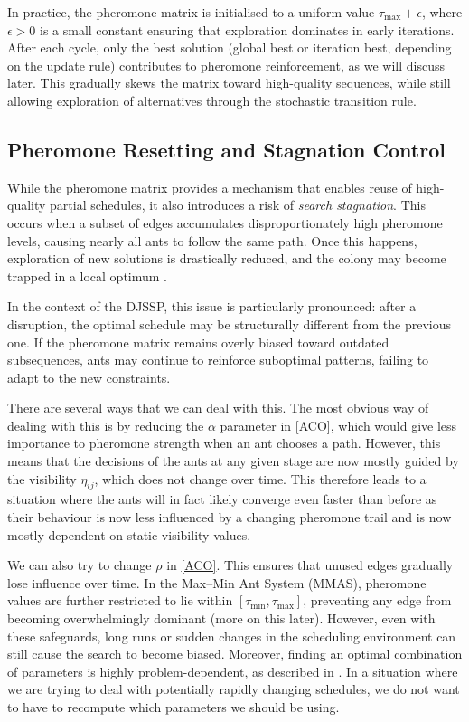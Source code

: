 \documentclass[final-report]{report-template}
\begin{document}
In practice, the pheromone matrix is initialised to a uniform value $\tau_{\max} + \epsilon$, where $\epsilon > 0$ is a small constant ensuring that exploration dominates in early iterations. After each cycle, only the best solution (global best or iteration best, depending on the update rule) contributes to pheromone reinforcement, as we will discuss later. This gradually skews the matrix toward high-quality sequences, while still allowing exploration of alternatives through the stochastic transition rule.

\subsection{Pheromone Resetting and Stagnation Control}

While the pheromone matrix provides a mechanism that enables reuse of high-quality partial schedules, it also introduces a risk of \emph{search stagnation}. This occurs when a subset of edges accumulates disproportionately high pheromone levels, causing nearly all ants to follow the same path. Once this happens, exploration of new solutions is drastically reduced, and the colony may become trapped in a local optimum \cite{484436}.

In the context of the DJSSP, this issue is particularly pronounced: after a disruption, the optimal schedule may be structurally different from the previous one. If the pheromone matrix remains overly biased toward outdated subsequences, ants may continue to reinforce suboptimal patterns, failing to adapt to the new constraints. 

There are several ways that we can deal with this. The most obvious way of dealing with this is by reducing the $\alpha$ parameter in \ref{ACO}, which would give less importance to pheromone strength when an ant chooses a path. However, this means that the decisions of the ants at any given stage are now mostly guided by the visibility $\eta_{ij}$, which does not change over time. This therefore leads to a situation where the ants will in fact likely converge even faster than before as their behaviour is now less influenced by a changing pheromone trail and is now mostly dependent on static visibility values.


We can also try to change $\rho$ in \ref{ACO}. This ensures that unused edges gradually lose influence over time. In the Max–Min Ant System (MMAS), pheromone values are further restricted to lie within $[\tau_{\min}, \tau_{\max}]$, preventing any edge from becoming overwhelmingly dominant (more on this later). However, even with these safeguards, long runs or sudden changes in the scheduling environment can still cause the search to become biased. Moreover, finding an optimal combination of parameters is highly problem-dependent, as described in \cite{ant_parameters}. In a situation where we are trying to deal with potentially rapidly changing schedules, we do not want to have to recompute which parameters we should be using.
\end{document}

